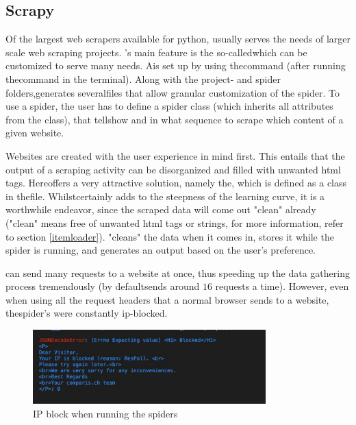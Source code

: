 \documentclass[main]{subfiles}
\begin{document}
\subsection{Scrapy}
Of the largest web scrapers available for python, 
\pkg[Scrapy] usually serves the needs of larger scale web scraping projects.
\pkg[Scrapy]'s main feature is the so-called\pkg[spider]which can be customized to serve many needs.
A\pkg[spider]is set up by using the command 
(after running the command in the terminal).
Along with the project- and spider folders,\pkg[Spider]\hspace{-2pt}generates several\hspace{-1pt}\pkg[.py] 
files that allow granular customization of the spider.
To use a spider, the user has to define a spider class (which inherits all attributes from the class),
that tells\pkg[Scrapy] how and in what sequence to scrape which content of a given website.

Websites are created with the user experience in mind first.
This entails that the output of a scraping activity can be disorganized and filled with unwanted \acs*{html} tags.
Here\pkg[Scrapy] offers a very attractive solution, namely the\pkg[ItemLoader], 
which is defined as a class in the\pkg[items.py] file.
Whilst\pkg[ItemLoader] certainly adds to the steepness of the learning curve, it is a worthwhile endeavor, 
since the scraped data will come out "clean" already ("clean" means free of unwanted \acs*{html} tags or strings, 
for more information, refer to section \ref{itemloader}). 
\pkg[ItemLoader] "cleans" the data when it comes in, stores it while the spider is running, 
and generates an output based on the user's preference.

\pkg[Scrapy] can send many requests to a website at once, 
thus speeding up the data gathering process tremendously (by default\pkg[Scrapy]sends around $16$ requests a time).
However, even when using all the request headers that a normal browser sends to a website, 
the\pkg[Scrapy] spider's were constantly \acs*{ip}-blocked.

\begin{figure}[htbp]
    \centerline{
        \includegraphics[width = 90mm]{prog_2.png}}
    \caption{IP block when running the spiders}
    \label{fig:block}
\end{figure}
\end{document}
